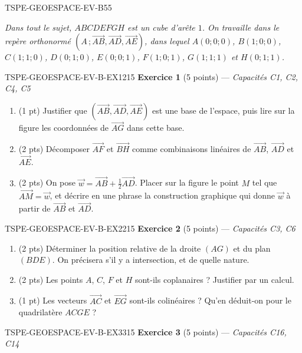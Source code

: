 \begin{evaluation}{TSPE-GEOESPACE-EV-B}{55}

\noindent
\textit{Dans tout le sujet, $ABCDEFGH$ est un cube d'arête $1$. On travaille dans le
repère orthonormé $\left(A\,;\vec{AB},\vec{AD},\vec{AE}\right)$, dans lequel
$A(0;0;0)$, $B(1;0;0)$, $C(1;1;0)$, $D(0;1;0)$, $E(0;0;1)$, $F(1;0;1)$,
$G(1;1;1)$ et $H(0;1;1)$.}

\begin{exercice}{TSPE-GEOESPACE-EV-B-EX1}{2}{15}
\textbf{Exercice 1} (5 points) — \textit{Capacités C1, C2, C4, C5}

\medskip

\begin{enumerate}
  \item (1 pt) Justifier que $\left(\vec{AB},\vec{AD},\vec{AE}\right)$ est une base
        de l'espace, puis lire sur la figure les coordonnées de $\vec{AG}$ dans
        cette base.
  \item (2 pts) Décomposer $\vec{AF}$ et $\vec{BH}$ comme combinaisons linéaires de
        $\vec{AB}$, $\vec{AD}$ et $\vec{AE}$.
  \item (2 pts) On pose $\vec{w}=\vec{AB}+\tfrac12\vec{AD}$. Placer sur la figure le
        point $M$ tel que $\vec{AM}=\vec{w}$, et décrire en une phrase la
        construction graphique qui donne $\vec{w}$ à partir de $\vec{AB}$ et
        $\vec{AD}$.
\end{enumerate}
\end{exercice}

\begin{exercice}{TSPE-GEOESPACE-EV-B-EX2}{2}{15}
\textbf{Exercice 2} (5 points) — \textit{Capacités C3, C6}

\medskip

\begin{enumerate}
  \item (2 pts) Déterminer la position relative de la droite $(AG)$ et du plan
        $(BDE)$. On précisera s'il y a intersection, et de quelle nature.
  \item (2 pts) Les points $A$, $C$, $F$ et $H$ sont-ils coplanaires ? Justifier par
        un calcul.
  \item (1 pt) Les vecteurs $\vec{AC}$ et $\vec{EG}$ sont-ils colinéaires ? Qu'en
        déduit-on pour le quadrilatère $ACGE$ ?
\end{enumerate}
\end{exercice}

\begin{exercice}{TSPE-GEOESPACE-EV-B-EX3}{3}{15}
\textbf{Exercice 3} (5 points) — \textit{Capacités C16, C14}


\end{exercice}
\end{evaluation}

